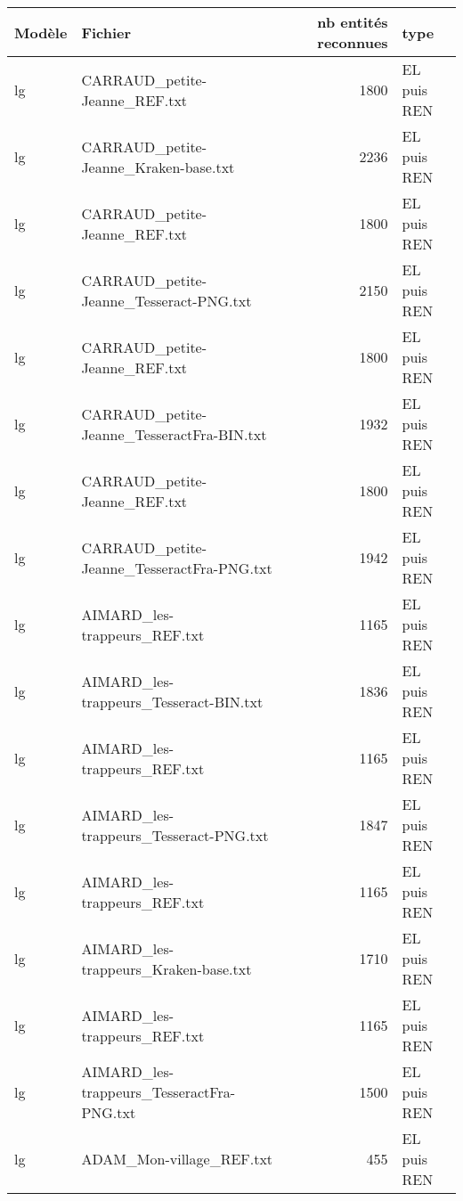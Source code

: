 \begin{tabular}{llrl}
\toprule
Modèle &                                            Fichier &  nb entités reconnues &        type \\
\midrule
    lg &                      CARRAUD\_petite-Jeanne\_REF.txt &                  1800 & EL puis REN \\
    lg &              CARRAUD\_petite-Jeanne\_Kraken-base.txt &                  2236 & EL puis REN \\
    lg &                      CARRAUD\_petite-Jeanne\_REF.txt &                  1800 & EL puis REN \\
    lg &            CARRAUD\_petite-Jeanne\_Tesseract-PNG.txt &                  2150 & EL puis REN \\
    lg &                      CARRAUD\_petite-Jeanne\_REF.txt &                  1800 & EL puis REN \\
    lg &         CARRAUD\_petite-Jeanne\_TesseractFra-BIN.txt &                  1932 & EL puis REN \\
    lg &                      CARRAUD\_petite-Jeanne\_REF.txt &                  1800 & EL puis REN \\
    lg &         CARRAUD\_petite-Jeanne\_TesseractFra-PNG.txt &                  1942 & EL puis REN \\
    lg &                       AIMARD\_les-trappeurs\_REF.txt &                  1165 & EL puis REN \\
    lg &             AIMARD\_les-trappeurs\_Tesseract-BIN.txt &                  1836 & EL puis REN \\
    lg &                       AIMARD\_les-trappeurs\_REF.txt &                  1165 & EL puis REN \\
    lg &             AIMARD\_les-trappeurs\_Tesseract-PNG.txt &                  1847 & EL puis REN \\
    lg &                       AIMARD\_les-trappeurs\_REF.txt &                  1165 & EL puis REN \\
    lg &               AIMARD\_les-trappeurs\_Kraken-base.txt &                  1710 & EL puis REN \\
    lg &                       AIMARD\_les-trappeurs\_REF.txt &                  1165 & EL puis REN \\
    lg &          AIMARD\_les-trappeurs\_TesseractFra-PNG.txt &                  1500 & EL puis REN \\
    lg &                           ADAM\_Mon-village\_REF.txt &                   455 & EL puis REN \\

\end{tabular}
